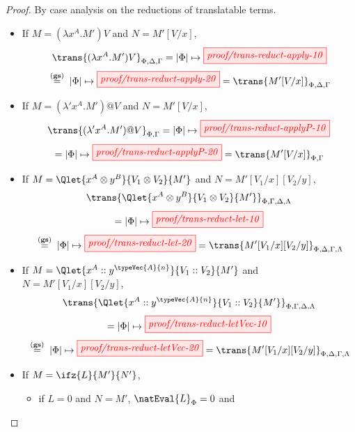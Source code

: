 \begin{proof}
    By case analysis on the reductions of translatable terms.
    \begin{itemize}
        \item If $M = (\lambda x^A.M')V$ and $N=M'[V/x]$,
            \[
                \trans{(\lambda x^A.M')V}_{\Phi,\Delta,\Gamma}
                =
                |\Phi|\mapsto\tikzfig{proof/trans-reduct-apply-10}
            \]
            \[
                \;\overset{\scriptstyle{\bf{(gs)}}}{=}\;
                |\Phi|\mapsto\tikzfig{proof/trans-reduct-apply-20}
                =
                \trans{M'[V/x]}_{\Phi,\Delta,\Gamma}
            \]
        \item If $M = (\lambda' x^A.M')@V$ and $N=M'[V/x]$,
            \[
                \trans{(\lambda' x^A.M')@V}_{\Phi,\Gamma}
                =
                |\Phi|\mapsto\tikzfig{proof/trans-reduct-applyP-10}
            \]
            \[
                =
                |\Phi|\mapsto\tikzfig{proof/trans-reduct-applyP-20}
                =
                \trans{M'[V/x]}_{\Phi,\Gamma}
            \]
        \item If $M = \Qlet{x^A\otimes y^B}{V_1 \otimes V_2}{M'}$ and $N=M'[V_1/x][V_2/y]$,
            \[
                \trans{\Qlet{x^A\otimes y^B}{V_1 \otimes V_2}{M'}}_{\Phi,\Gamma,\Delta,\Lambda}
            \]
            \[
                =
                |\Phi|\mapsto\tikzfig{proof/trans-reduct-let-10}
            \]
            \[
                \;\overset{\scriptstyle{\bf{(gs)}}}{=}\;
                |\Phi|\mapsto\tikzfig{proof/trans-reduct-let-20}
                =
                \trans{M'[V_1/x][V_2/y]}_{\Phi,\Delta,\Gamma,\Lambda}
            \]
        \item If $M = \Qlet{x^A :: y^{\typeVec{A}{n}}}{V_1 :: V_2}{M'}$ and $N=M'[V_1/x][V_2/y]$,
            \[
                \trans{\Qlet{x^A :: y^{\typeVec{A}{n}}}{V_1 :: V_2}{M'}}_{\Phi,\Gamma,\Delta,\Lambda}
            \]
            \[
                =
                |\Phi|\mapsto\tikzfig{proof/trans-reduct-letVec-10}
            \]
            \[
                \;\overset{\scriptstyle{\bf{(gs)}}}{=}\;
                |\Phi|\mapsto\tikzfig{proof/trans-reduct-letVec-20}
                =
                \trans{M'[V_1/x][V_2/y]}_{\Phi,\Delta,\Gamma,\Lambda}
            \]
        \item If $M = \ifz{L}{M'}{N'}$,
            \begin{itemize}
                \item if $L=0$ and $N = M'$, $\natEval{L}_\Phi = 0$ and

\end{itemize}
\end{itemize}
\end{proof}

